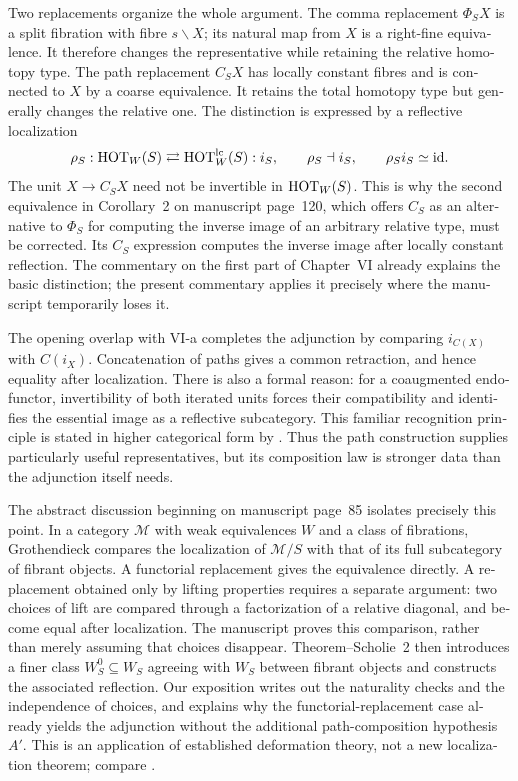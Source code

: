 \begin{otherlanguage}{english}
Two replacements organize the whole argument. The comma replacement $\Phi_SX$ is a split fibration with fibre $s\backslash X$; its natural map from $X$ is a right-fine equivalence. It therefore changes the representative while retaining the relative homotopy type. The path replacement $C_SX$ has locally constant fibres and is connected to $X$ by a coarse equivalence. It retains the total homotopy type but generally changes the relative one. The distinction is expressed by a reflective localization
\[
\rho_S:\mathrm{HOT}_W(S)\rightleftarrows\mathrm{HOT}_W^{\mathrm{lc}}(S):i_S,
\qquad \rho_S\dashv i_S,
\qquad \rho_Si_S\simeq\mathrm{id}.
\]
The unit $X\to C_SX$ need not be invertible in $\mathrm{HOT}_W(S)$. This is why the second equivalence in Corollary~2 on manuscript page~120, which offers $C_S$ as an alternative to $\Phi_S$ for computing the inverse image of an arbitrary relative type, must be corrected. Its $C_S$ expression computes the inverse image after locally constant reflection. The commentary on the first part of Chapter~VI already explains the basic distinction; the present commentary applies it precisely where the manuscript temporarily loses it.

The opening overlap with VI-a completes the adjunction by comparing $i_{C(X)}$ with $C(i_X)$. Concatenation of paths gives a common retraction, and hence equality after localization. There is also a formal reason: for a coaugmented endofunctor, invertibility of both iterated units forces their compatibility and identifies the essential image as a reflective subcategory. This familiar recognition principle is stated in higher categorical form by \citet[Proposition~5.2.7.4]{Lurie2009HTT}. Thus the path construction supplies particularly useful representatives, but its composition law is stronger data than the adjunction itself needs.

The abstract discussion beginning on manuscript page~85 isolates precisely this point. In a category $\mathcal M$ with weak equivalences $W$ and a class of fibrations, Grothendieck compares the localization of $\mathcal M/S$ with that of its full subcategory of fibrant objects. A functorial replacement gives the equivalence directly. A replacement obtained only by lifting properties requires a separate argument: two choices of lift are compared through a factorization of a relative diagonal, and become equal after localization. The manuscript proves this comparison, rather than merely assuming that choices disappear. Theorem--Scholie~2 then introduces a finer class $W_S^0\subseteq W_S$ agreeing with $W_S$ between fibrant objects and constructs the associated reflection. Our exposition writes out the naturality checks and the independence of choices, and explains why the functorial-replacement case already yields the adjunction without the additional path-composition hypothesis $A'$. This is an application of established deformation theory, not a new localization theorem; compare \citet[Theorem~2.2.11]{Riehl2014}.


\end{otherlanguage}
